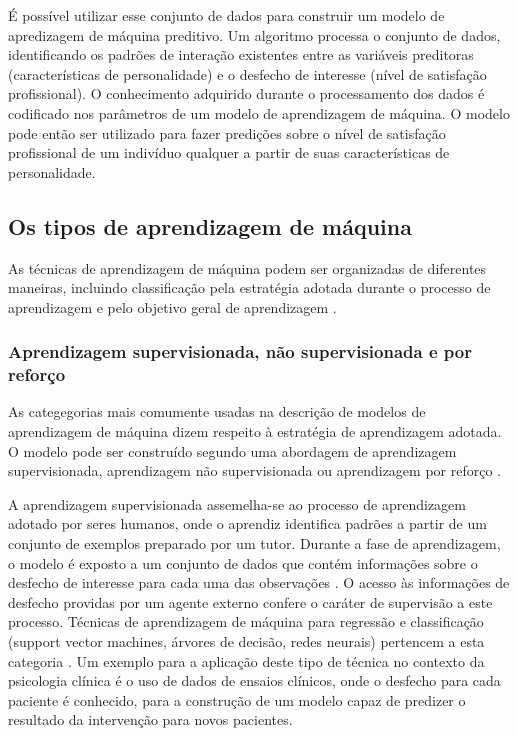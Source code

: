É possível utilizar esse conjunto de dados para construir um modelo de apredizagem de máquina preditivo. Um algoritmo processa o conjunto de dados,
identificando os padrões de interação existentes entre as variáveis preditoras (características de personalidade) e o desfecho de interesse (nível
de satisfação profissional). O conhecimento adquirido durante o processamento dos dados é codificado nos parâmetros de um modelo de aprendizagem de
máquina. O modelo pode então ser utilizado para fazer predições sobre o nível de satisfação profissional de um indivíduo qualquer a partir de suas
características de personalidade.

\subsection{Os tipos de aprendizagem de máquina}
As técnicas de aprendizagem de máquina podem ser organizadas de diferentes maneiras, incluindo classificação pela estratégia adotada durante o processo
de aprendizagem e pelo objetivo geral de aprendizagem \cite{Theobald2021, Ng2001}.

\subsubsection{Aprendizagem supervisionada, não supervisionada e por reforço}
As categegorias mais comumente usadas na descrição de modelos de aprendizagem de máquina dizem respeito à estratégia de aprendizagem adotada. O
modelo pode ser construído segundo uma abordagem de aprendizagem supervisionada, aprendizagem não supervisionada ou aprendizagem por reforço
\cite{Theobald2021, Bi2019}.

A aprendizagem supervisionada assemelha-se ao processo de aprendizagem adotado por seres humanos, onde o aprendiz identifica padrões a partir de
um conjunto de exemplos preparado por um tutor. Durante a fase de aprendizagem, o modelo é exposto a um conjunto de dados que contém informações
sobre o desfecho de interesse para cada uma das observações \cite{Theobald2021, Bi2019}. O acesso às informações de desfecho providas por um agente
externo confere o caráter de supervisão a este processo. Técnicas de aprendizagem de máquina para regressão e classificação (support vector machines,
árvores de decisão, redes neurais) pertencem a esta categoria \cite{Bi2019}. Um exemplo para a aplicação deste tipo de técnica no contexto da psicologia
clínica é o uso de dados de ensaios clínicos, onde o desfecho para cada paciente é conhecido, para a construção de um modelo capaz de predizer o
resultado da intervenção para novos pacientes.

